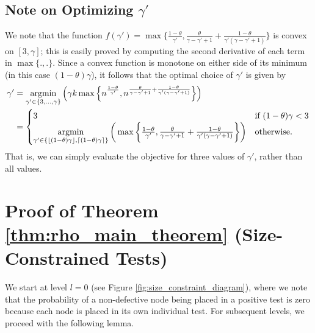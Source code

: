 \subsection{Note on Optimizing $\gamma'$} \label{sec:convex}

We note that the function $f(\gamma') = \max\big\{\frac{1-\theta}{\gamma'},\frac{\theta}{\gamma-\gamma'+1}+\frac{1-\theta}{\gamma'(\gamma-\gamma'+1)}\big\}$ is convex on $[3,\gamma]$; this is easily proved by computing the second derivative of each term in $\max\{.,.\}$. 
Since a convex function is monotone on either side of its minimum (in this case $(1-\theta)\gamma$), it follows that the optimal choice of $\gamma'$ is given by
\begin{align}
    \gamma'&=\operatorname*{argmin}\limits_{\gamma'\in\{3,\dots,\gamma\}}\Big(\gamma k\max\Big\{n^{\frac{1-\theta}{\gamma'}},
    n^{\frac{\theta}{\gamma-\gamma'+1}+\frac{1-\theta}{\gamma'(\gamma-\gamma'+1)}}\Big\}\Big) \\
    &=
    \begin{cases}
    3 &\text{if $(1-\theta)\gamma<3$} \\
    \operatorname*{argmin}\limits_{\gamma'\in\{\lfloor(1-\theta)\gamma\rfloor,\lceil(1-\theta)\gamma\rceil\}}\bigg(\max\bigg\{\frac{1-\theta}{\gamma'},\frac{\theta}{\gamma-\gamma'+1}+\frac{1-\theta}{\gamma'(\gamma-\gamma'+1)}\bigg\}\bigg) &\text{otherwise.} \label{eq:gamma'}
    \end{cases}
\end{align}
That is, we can simply evaluate the objective for three values of $\gamma'$, rather than all values.

\section{Proof of Theorem \ref{thm:rho_main_theorem} (Size-Constrained Tests)} \label{sec:rho_algo_analysis}

We start at level $l=0$ (see Figure \ref{fig:size_constraint_diagram}), where we note that the probability of a non-defective node being placed in a positive test is zero because each node is placed in its own individual test.  For subsequent levels, we proceed with the following lemma.

